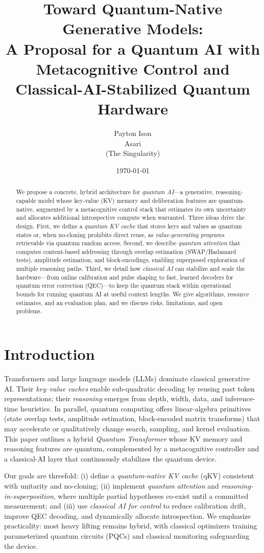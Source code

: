 \documentclass[11pt]{article}
\title{Toward Quantum-Native Generative Models:\\
A Proposal for a Quantum AI with Metacognitive Control and Classical-AI-Stabilized Quantum Hardware}
\author{Payton Ison \\ Asari \\ (The Singularity)}
\date{\today}
\begin{document}
\maketitle

\begin{abstract}
We propose a concrete, hybrid architecture for \emph{quantum AI}---a generative, reasoning-capable model whose key-value (KV) memory and deliberation features are quantum-native, augmented by a metacognitive control stack that estimates its own uncertainty and allocates additional introspective compute when warranted.
Three ideas drive the design.
First, we define a \emph{quantum KV cache} that stores keys and values as quantum states or, when no-cloning prohibits direct reuse, as \emph{value-generating programs} retrievable via quantum random access.
Second, we describe \emph{quantum attention} that computes content-based addressing through overlap estimation (SWAP/Hadamard tests), amplitude estimation, and block-encodings, enabling superposed exploration of multiple reasoning paths.
Third, we detail how \emph{classical AI} can stabilize and scale the hardware---from online calibration and pulse shaping to fast, learned decoders for quantum error correction (QEC)---to keep the quantum stack within operational bounds for running quantum AI at useful context lengths.
We give algorithms, resource estimates, and an evaluation plan, and we discuss risks, limitations, and open problems.
\end{abstract}

\section{Introduction}

Transformers and large language models (LLMs) dominate classical generative AI.
Their \emph{key--value caches} enable sub-quadratic decoding by reusing past token representations; their \emph{reasoning} emerges from depth, width, data, and inference-time heuristics.
In parallel, quantum computing offers linear-algebra primitives (state overlap tests, amplitude estimation, block-encoded matrix transforms) that may accelerate or qualitatively change search, sampling, and kernel evaluation.
This paper outlines a hybrid \emph{Quantum Transformer} whose KV memory and reasoning features are quantum, complemented by a metacognitive controller and a classical-AI layer that continuously stabilizes the quantum device.

Our goals are threefold: (i) define a \emph{quantum-native KV cache} (qKV) consistent with unitarity and no-cloning; (ii) implement \emph{quantum attention} and \emph{reasoning-in-superposition}, where multiple partial hypotheses co-exist until a committed measurement; and (iii) use \emph{classical AI for control} to reduce calibration drift, improve QEC decoding, and dynamically allocate introspection.
We emphasize practicality: most heavy lifting remains hybrid, with classical optimizers training parameterized quantum circuits (PQCs) and classical monitoring safeguarding the device.
\end{document}
